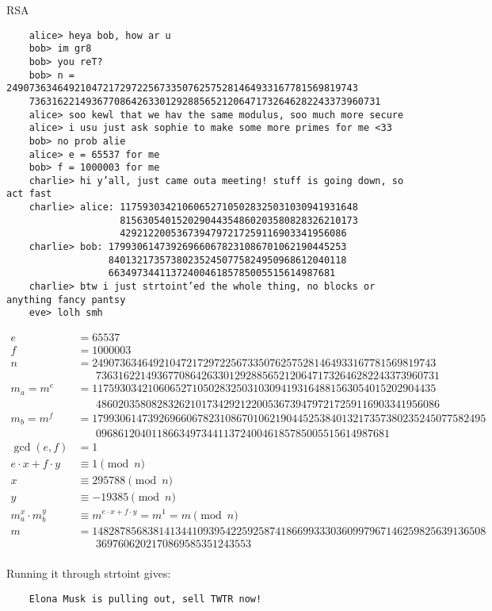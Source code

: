 \begin{problem}
  RSA

  \begin{Verbatim}
    alice> heya bob, how ar u
    bob> im gr8
    bob> you reT?
    bob> n = 24907363464921047217297225673350762575281464933167781569819743
    73631622149367708642633012928856521206471732646282243373960731
    alice> soo kewl that we hav the same modulus, soo much more secure
    alice> i usu just ask sophie to make some more primes for me <33
    bob> no prob alie
    alice> e = 65537 for me
    bob> f = 1000003 for me
    charlie> hi y’all, just came outa meeting! stuff is going down, so act fast
    charlie> alice: 117593034210606527105028325031030941931648
                    815630540152029044354860203580828326210173
                    4292122005367394797217259116903341956086
    charlie> bob: 179930614739269660678231086701062190445253
                  840132173573802352450775824950968612040118
                  6634973441137240046185785005515614987681
    charlie> btw i just strtoint’ed the whole thing, no blocks or anything fancy pantsy
    eve> lolh smh
  \end{Verbatim}
\end{problem}

\begin{Answer}

  \begin{align*}
    e &= 65537\\
    f &= 1000003\\
    n &= 24907363464921047217297225673350762575281464933167781569819743\\
      & \;\;\;\;\;\;  73631622149367708642633012928856521206471732646282243373960731\\
    m_{a} = m^{e} &= 11759303421060652710502832503103094193164881563054015202904435\\
      & \;\;\;\;\;\;  48602035808283262101734292122005367394797217259116903341956086\\
    m_{b} = m^{f} &= 17993061473926966067823108670106219044525384013217357380235245077582495\\
      & \;\;\;\;\;\;  09686120401186634973441137240046185785005515614987681\\
    \gcd(e,f) &= 1\\
    e \cdot x + f \cdot y &\equiv 1 \pmod{n}\\
    x &\equiv 295788 \pmod n\\
    y &\equiv -19385 \pmod n\\
    m_{a}^x \cdot m_{b}^y &\equiv m^{e \cdot x + f \cdot y} = m^{1} = m \pmod{n}\\
    m &= 14828785683814134410939542259258741866993330360997967146259825639136508\\
      & \;\;\;\;\;\;3697606202170869585351243553\\
  \end{align*}

  Running it through strtoint gives:
  \begin{Verbatim}
    Elona Musk is pulling out, sell TWTR now!
  \end{Verbatim}
\end{Answer}



